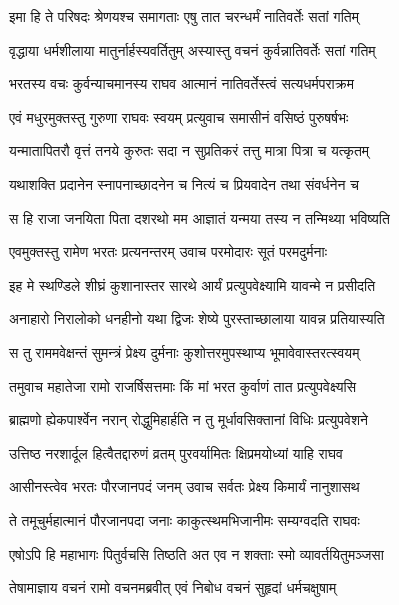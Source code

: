 \twolineshloka
{इमा हि ते परिषदः श्रेणयश्च समागताः}
{एषु तात चरन्धर्मं नातिवर्तेः सतां गतिम्} %

\twolineshloka
{वृद्धाया धर्मशीलाया मातुर्नार्हस्यवर्तितुम्}
{अस्यास्तु वचनं कुर्वन्नातिवर्तेः सतां गतिम्} %

\twolineshloka
{भरतस्य वचः कुर्वन्याचमानस्य राघव}
{आत्मानं नातिवर्तेस्त्वं सत्यधर्मपराक्रम} %

\twolineshloka
{एवं मधुरमुक्तस्तु गुरुणा राघवः स्वयम्}
{प्रत्युवाच समासीनं वसिष्ठं पुरुषर्षभः} %

\twolineshloka
{यन्मातापितरौ वृत्तं तनये कुरुतः सदा}
{न सुप्रतिकरं तत्तु मात्रा पित्रा च यत्कृतम्} %

\twolineshloka
{यथाशक्ति प्रदानेन स्नापनाच्छादनेन च}
{नित्यं च प्रियवादेन तथा संवर्धनेन च} %

\twolineshloka
{स हि राजा जनयिता पिता दशरथो मम}
{आज्ञातं यन्मया तस्य न तन्मिथ्या भविष्यति} %

\twolineshloka
{एवमुक्तस्तु रामेण भरतः प्रत्यनन्तरम्}
{उवाच परमोदारः सूतं परमदुर्मनाः} %

\twolineshloka
{इह मे स्थण्डिले शीघ्रं कुशानास्तर सारथे}
{आर्यं प्रत्युपवेक्ष्यामि यावन्मे न प्रसीदति} %

\twolineshloka
{अनाहारो निरालोको धनहीनो यथा द्विजः}
{शेष्ये पुरस्ताच्छालाया यावन्न प्रतियास्यति} %

\twolineshloka
{स तु राममवेक्षन्तं सुमन्त्रं प्रेक्ष्य दुर्मनाः}
{कुशोत्तरमुपस्थाप्य भूमावेवास्तरत्स्वयम्} %

\twolineshloka
{तमुवाच महातेजा रामो राजर्षिसत्तमाः}
{किं मां भरत कुर्वाणं तात प्रत्युपवेक्ष्यसि} %

\twolineshloka
{ब्राह्मणो ह्येकपार्श्वेन नरान् रोद्धुमिहार्हति}
{न तु मूर्धावसिक्तानां विधिः प्रत्युपवेशने} %

\twolineshloka
{उत्तिष्ठ नरशार्दूल हित्वैतद्दारुणं व्रतम्}
{पुरवर्यामितः क्षिप्रमयोध्यां याहि राघव} %

\twolineshloka
{आसीनस्त्वेव भरतः पौरजानपदं जनम्}
{उवाच सर्वतः प्रेक्ष्य किमार्यं नानुशासथ} %

\twolineshloka
{ते तमूचुर्महात्मानं पौरजानपदा जनाः}
{काकुत्स्थमभिजानीमः सम्यग्वदति राघवः} %

\twolineshloka
{एषोऽपि हि महाभागः पितुर्वचसि तिष्ठति}
{अत एव न शक्ताः स्मो व्यावर्तयितुमञ्जसा} %

\twolineshloka
{तेषामाज्ञाय वचनं रामो वचनमब्रवीत्}
{एवं निबोध वचनं सुहृदां धर्मचक्षुषाम्} %


